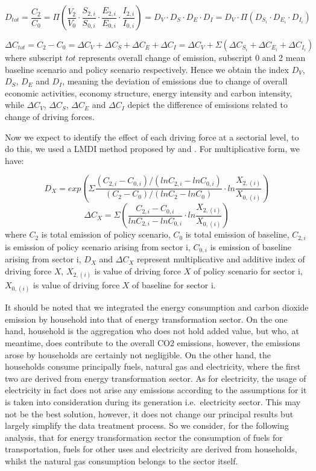\documentclass[
]{article}
\begin{document}
\[ D_{tot} =\frac{C_{2}}{C_{0}} = \Pi(\frac{V_{2}}{V_{0}} \cdot \frac{S_{2,i}}{S_{0,i}} \cdot \frac{E_{2,i}}{E_{0,i}}  \cdot \frac{I_{2,i}}{I_{0,i}}) = D_{V}  \cdot  D_{S} \cdot D_{E} \cdot D_{I} = D_{V}  \cdot \Pi ( D_{S_{i}} \cdot D_{E_{i}} \cdot D_{I_{i}}) \tag{3}\]

\[ \Delta C_{tot} = C_{2} - C_{0} = \Delta C_{V} + \Delta C_{S} + \Delta C_{E} + \Delta C_{I} = \Delta C_{V} + \Sigma( \Delta C_{S_{i}} + \Delta C_{E_{i}} + \Delta C_{I_{i}}) \tag{4}\]
where subscript \(tot\) represents overall change of emission, subscript
0 and 2 mean baseline scenario and policy scenario respectively. Hence
we obtain the index \(D_{V}\), \(D_{S}\), \(D_{E}\) and \(D_{I}\),
meaning the deviation of emissions due to change of overall economic
activities, economy structure, energy intensity and carbon intensity,
while \(\Delta C_{V}\), \(\Delta C_{S}\), \(\Delta C_{E}\) and
\(\Delta C_{I}\) depict the difference of emissions related to change of
driving forces.

Now we expect to identify the effect of each driving force at a
sectorial level, to do this, we used a LMDI method proposed by
\textcite{ang1997} and \textcite{ang2005}. For multiplicative form, we
have:

\[ D_{X} = exp ( \Sigma \frac{(C_{2,i}-C_{0,i})/(lnC_{2,i}-lnC_{0,i})}{(C_{2}-C_{0})/(lnC_{2}-lnC_{0})} \cdot ln \frac{X_{2,(i)}}{X_{0,(i)}} ) \tag{11}\]
\[ \Delta C_{X} =  \Sigma (\frac{C_{2,i}-C_{0,i}}{lnC_{2,i}-lnC_{0,i}} \cdot ln\frac{X_{2,(i)}}{X_{0,(i)}}) \tag{12} \]
where \(C_{2}\) is total emission of policy scenario, \(C_{0}\) is total
emission of baseline, \(C_{2,i}\) is emission of policy scenario arising
from sector i, \(C_{0,i}\) is emission of baseline arising from sector
i, \(D_{X}\) and \(\Delta C_{X}\) represent multiplicative and additive
index of driving force \(X\), \(X_{2,(i)}\) is value of driving force
\(X\) of policy scenario for sector i, \(X_{0,(i)}\) is value of driving
force \(X\) of baseline for sector i.

It should be noted that we integrated the energy consumption and carbon
dioxide emission by household into that of energy transformation sector.
On the one hand, household is the aggregation who does not hold added
value, but who, at meantime, does contribute to the overall CO2
emissions, however, the emissions arose by households are certainly not
negligible. On the other hand, the households consume principally fuels,
natural gas and electricity, where the first two are derived from energy
transformation sector. As for electricity, the usage of electricity in
fact does not arise any emissions according to the assumptions for it is
taken into consideration during its generation i.e.~electricity sector.
This may not be the best solution, however, it does not change our
principal results but largely simplify the data treatment process. So we
consider, for the following analysis, that for energy transformation
sector the consumption of fuels for transportation, fuels for other uses
and electricity are derived from households, whilst the natural gas
consumption belongs to the sector itself.
\end{document}
